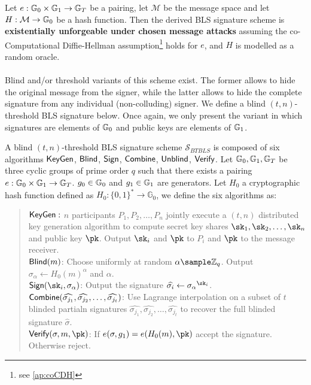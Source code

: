 \begin{theorem}
	Let $e : \mathbb{G}_0 \times \mathbb{G}_1 \rightarrow \mathbb{G}_T$ be a pairing, let $\mathcal{M}$ be the message space and let $H: \mathcal{M} \rightarrow \mathbb{G}_0$ be a hash function. Then the derived BLS signature scheme is \textbf{existentially unforgeable under chosen message attacks} assuming the co-Computational Diffie-Hellman assumption\footnote{see \autoref{ap:coCDH}} holds for $e$, and $H$ is modelled as a random oracle.
\end{theorem} 

\paragraph{} Blind and/or threshold variants of this scheme exist. The former allows to hide the original message from the signer, while the latter allows to hide the complete signature from any individual (non-colluding) signer. We define a blind $(t,n)$-threshold BLS signature below. Once again, we only present the variant in which signatures are elements of $\mathbb{G}_0$ and public keys are elements of $\mathbb{G}_1$. 

\begin{definition}\label{def:BTBLS} A blind $(t,n)$-threshold BLS signature scheme $\mathcal{S}_{BTBLS}$ is composed of six algorithms $\mathsf{KeyGen}$, $\mathsf{Blind}$, $\mathsf{Sign}$, $\mathsf{Combine}$, $\mathsf{Unblind}$, $\mathsf{Verify}$. Let $\mathbb{G}_0, \mathbb{G}_1, \mathbb{G}_T$ be three cyclic groups of prime order $q$ such that there exists a pairing $e : \mathbb{G}_0 \times \mathbb{G}_1 \rightarrow \mathbb{G}_T$. $g_0 \in \mathbb{G}_0$ and $g_1 \in \mathbb{G}_1$ are generators. Let $H_0$ a cryptographic hash function defined as $H_0: \{0,1\}^* \rightarrow \mathbb{G}_0$, we define the six algorithms as:
	
	\begin{quote}
		$\mathsf{KeyGen}:$ $n$ participants $P_1, P_2, \dots, P_n$ jointly execute a $(t,n)$ distributed key generation algorithm to compute secret key shares $\sk_1, \sk_2, \dots, \sk_n$ and public key $\pk$. Output $\sk_i$ and $\pk$ to $P_i$ and $\pk$ to the message receiver.\\
		$\mathsf{Blind}(m)$: Choose uniformly at random $\alpha \sample \mathbb{Z}_q$. Output $\sigma_\alpha \leftarrow H_0(m)^\alpha$ and $\alpha$. \\
		$\Sign(\sk_i, \sigma_\alpha)$: Output the signature $\widehat{\sigma_i} \leftarrow {\sigma_\alpha}^{\sk_i}$. \\
		$\mathsf{Combine}(\widehat{\sigma_{j_1}}, \widehat{\sigma_{j_2}}, \dots, \widehat{\sigma_{j_t}})$: Use Lagrange interpolation on a subset of $t$ blinded partialn signatures $\widehat{\sigma_{j_1}}, \widehat{\sigma_{j_2}}, \dots, \widehat{\sigma_{j_t}}$ to recover the full blinded signature $\widehat \sigma$. \\
		$\Verif(\sigma, m, \pk)$: If $e(\sigma, g_1) = e(H_0(m), \pk)$ accept the signature. Otherwise reject.
	\end{quote}
	
\end{definition}




